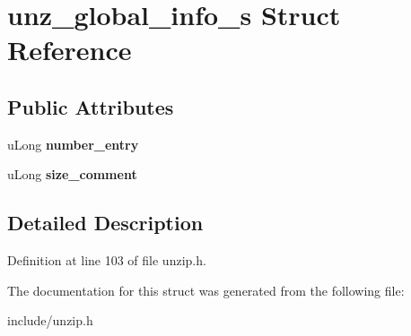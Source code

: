 \hypertarget{structunz__global__info__s}{\section{unz\-\_\-global\-\_\-info\-\_\-s Struct Reference}
\label{structunz__global__info__s}
}
\subsection*{Public Attributes}
\begin{DoxyCompactItemize}
\item 
\hypertarget{structunz__global__info__s_a827d1cd1d09f12acd6c2ee12494cb320}{u\-Long {\bfseries number\-\_\-entry}}\label{structunz__global__info__s_a827d1cd1d09f12acd6c2ee12494cb320}

\item 
\hypertarget{structunz__global__info__s_a10b58ab57b62301de813ecac0e974363}{u\-Long {\bfseries size\-\_\-comment}}\label{structunz__global__info__s_a10b58ab57b62301de813ecac0e974363}

\end{DoxyCompactItemize}


\subsection{Detailed Description}


Definition at line 103 of file unzip.\-h.



The documentation for this struct was generated from the following file\-:\begin{DoxyCompactItemize}
\item 
include/unzip.\-h\end{DoxyCompactItemize}

